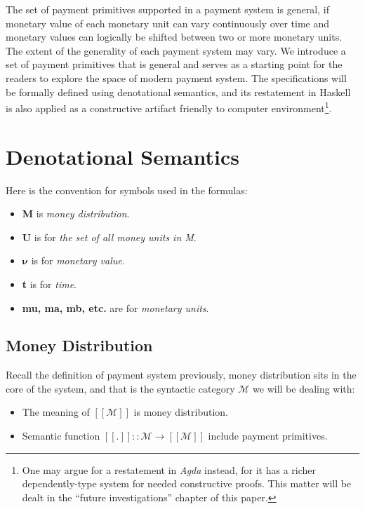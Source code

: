 The set of payment primitives supported in a payment system is general, if monetary value of each monetary unit can vary
continuously over time and monetary values can logically be shifted between two or more monetary units. The extent of
the generality of each payment system may vary. We introduce a set of payment primitives that is general and serves as a
starting point for the readers to explore the space of modern payment system. The specifications will be formally
defined using denotational semantics, and its restatement in Haskell is also applied as a constructive artifact friendly
to computer environment\footnote{One may argue for a restatement in \textit{Agda} instead, for it has a richer
dependently-type system for needed constructive proofs. This matter will be dealt in the ``future investigations'' chapter
of this paper.}.

\section{Denotational Semantics}

Here is the convention for symbols used in the formulas:

\begin{itemize}
    \item \textbf{M} is \textit{money distribution}.
    \item \textbf{U} is for \textit{the set of all money units in M}.
    \item $\boldsymbol{\nu}$ is for \textit{monetary value}.
    \item \textbf{t} is for \textit{time}.
    \item \textbf{mu, ma, mb, etc.} are for \textit{monetary units}.
\end{itemize}

\subsection{Money Distribution}

Recall the definition of payment system previously, money distribution sits in the core of the system, and that is the
syntactic category $\mathcal{M}$ we will be dealing with:

\begin{itemize}
\item The meaning of $[\![\mathcal{M}]\!]$ is money distribution.
\item Semantic function $[\![.]\!] :: \mathcal{M} \rightarrow [\![\mathcal{M}]\!] $ include payment primitives.
\end{itemize}

